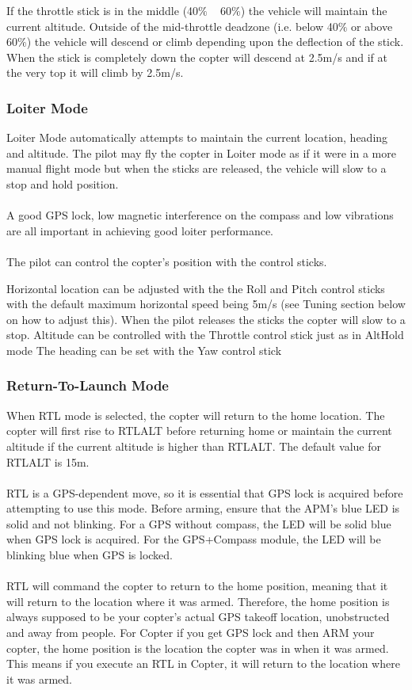     If the throttle stick is in the middle (40$\%$ ~ 60$\%$) the vehicle will maintain the current altitude.
    Outside of the mid-throttle deadzone (i.e. below 40$\%$ or above 60$\%$) the vehicle will descend or climb depending upon the deflection of the stick. When the stick is completely down the copter will descend at 2.5m/s and if at the very top it will climb by 2.5m/s.

\subsubsection{Loiter Mode}
Loiter Mode automatically attempts to maintain the current location, heading and altitude. The pilot may fly the copter in Loiter mode as if it were in a more manual flight mode but when the sticks are released, the vehicle will slow to a stop and hold position.
\\\\
A good GPS lock, low magnetic interference on the compass and low vibrations are all important in achieving good loiter performance.
\\\\
The pilot can control the copter’s position with the control sticks.

    Horizontal location can be adjusted with the the Roll and Pitch control sticks with the default maximum horizontal speed being 5m/s (see Tuning section below on how to adjust this). When the pilot releases the sticks the copter will slow to a stop.
    Altitude can be controlled with the Throttle control stick just as in AltHold mode
    The heading can be set with the Yaw control stick

\subsubsection{Return-To-Launch Mode}
When RTL mode is selected, the copter will return to the home location. The copter will first rise to RTLALT before returning home or maintain the current altitude if the current altitude is higher than RTLALT. The default value for RTLALT is 15m.
\\\\
RTL is a GPS-dependent move, so it is essential that GPS lock is acquired before attempting to use this mode. Before arming, ensure that the APM’s blue LED is solid and not blinking. For a GPS without compass, the LED will be solid blue when GPS lock is acquired. For the GPS+Compass module, the LED will be blinking blue when GPS is locked.
\\\\
RTL will command the copter to return to the home position, meaning that it will return to the location where it was armed. Therefore, the home position is always supposed to be your copter’s actual GPS takeoff location, unobstructed and away from people. For Copter if you get GPS lock and then ARM your copter, the home position is the location the copter was in when it was armed. This means if you execute an RTL in Copter, it will return to the location where it was armed.

